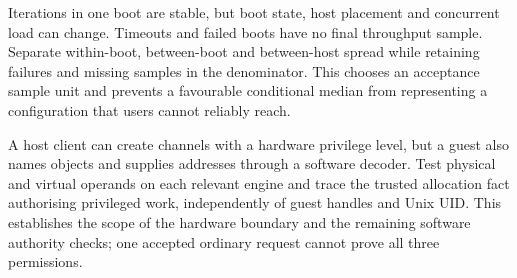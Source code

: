 {Iterations in one boot are stable, but boot state, host placement and concurrent load can change.
Timeouts and failed boots have no final throughput sample.}
{Separate within-boot, between-boot and between-host spread while retaining failures and missing
samples in the denominator.}
{This chooses an acceptance sample unit and prevents a favourable conditional median from
representing a configuration that users cannot reliably reach.}
\label{q:sampling}

{A host client can create channels with a hardware privilege level, but a guest also names objects
and supplies addresses through a software decoder.}
{Test physical and virtual operands on each relevant engine and trace the trusted allocation fact
authorising privileged work, independently of guest handles and Unix UID.}
{This establishes the scope of the hardware boundary and the remaining software authority checks;
one accepted ordinary request cannot prove all three permissions.}
\label{q:privilege}

